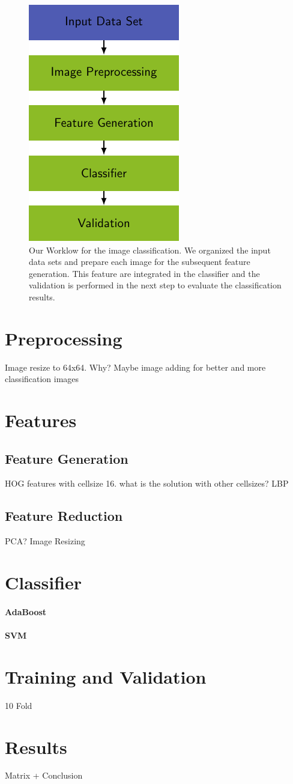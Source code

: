 \documentclass[a4paper,10pt]{article}
\begin{document}
\begin{figure}[h]
\centering
\includegraphics[scale=1]{images/Workflow.pdf}
\caption{Our Worklow for the image classification. We organized the input data sets and prepare each image for the subsequent feature generation.
This feature are integrated in the classifier and the validation is performed in the next step to evaluate the classification results.}
\label{fig:workflow}
\end{figure}

\section{Preprocessing}
Image resize to 64x64. Why?
Maybe image adding for better and more classification images

\section{Features}
\subsection{Feature Generation}
HOG features with cellsize 16. what is the solution with other cellsizes?
LBP

\subsection{Feature Reduction}
PCA? Image Resizing

\section{Classifier}
\paragraph{AdaBoost}
\paragraph{SVM}

\section{Training and Validation}
10 Fold

\section{Results}
Matrix + Conclusion 
\end{document}
